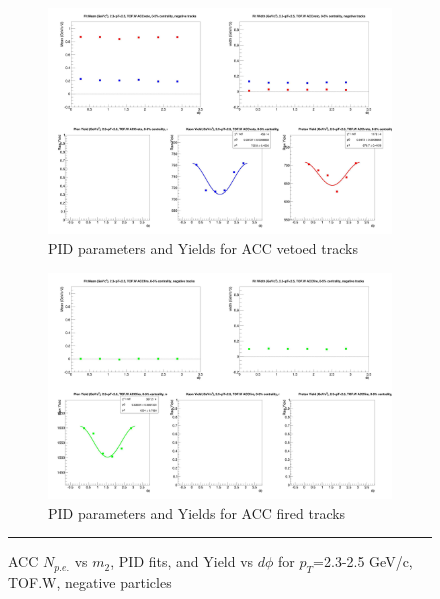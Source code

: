 \begin{figure}[H]
  \ContinuedFloat
    \begin{subfigure}{1\textwidth}
    \includegraphics[width=1\textwidth]{hiptfits/neg/fitParams_tof2_cent0_ch0_pT-23-25.jpg}
    \caption{PID parameters and Yields for ACC vetoed tracks}
    \end{subfigure}    
    \begin{subfigure}{1\textwidth}
    \includegraphics[width=1\textwidth]{hiptfits/neg/fitParams_tof3_cent0_ch0_pT-23-25.jpg}
    \caption{PID parameters and Yields for ACC fired tracks}
    \end{subfigure} 
    \rule{35em}{0.5pt}
  \caption[ACC $N_{p.e.}$ vs $m_2$, PID fits, and Yield vs $d\phi$ for $p_T$=2.3-2.5 GeV/c, TOF.W, negative particles]{ACC $N_{p.e.}$ vs $m_2$, PID fits, and Yield vs $d\phi$ for $p_T$=2.3-2.5 GeV/c, TOF.W, negative particles}
  \label{fig:acc23-25neg}
\end{figure}


